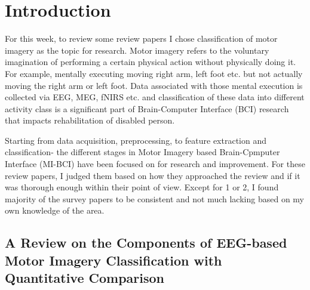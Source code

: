 \maketitle

\section*{Introduction}
For this week, to review some review papers I chose classification of motor imagery as the topic for research. Motor imagery refers to the voluntary imagination of performing a certain physical action without physically doing it. For example, mentally executing moving right arm, left foot etc. but not actually moving the right arm or left foot. Data associated with those mental execution is collected via EEG, MEG, fNIRS etc. and classification of these data into different activity class is a significant part of Brain-Computer Interface (BCI) research that impacts rehabilitation of disabled person. 

Starting from data acquisition, preprocessing, to feature extraction and classification- the different stages in Motor Imagery based Brain-Cpmputer Interface (MI-BCI) have been focused on for research and improvement. For these review papers, I judged them based on how they approached the review and if it was thorough enough within their point of view. Except for 1 or 2, I found majority of the survey papers to be consistent and not much lacking based on my own knowledge of the area.\\

\subsection*{A Review on the Components of EEG-based Motor Imagery Classification with Quantitative Comparison}\cite{rahman_review_2017}

